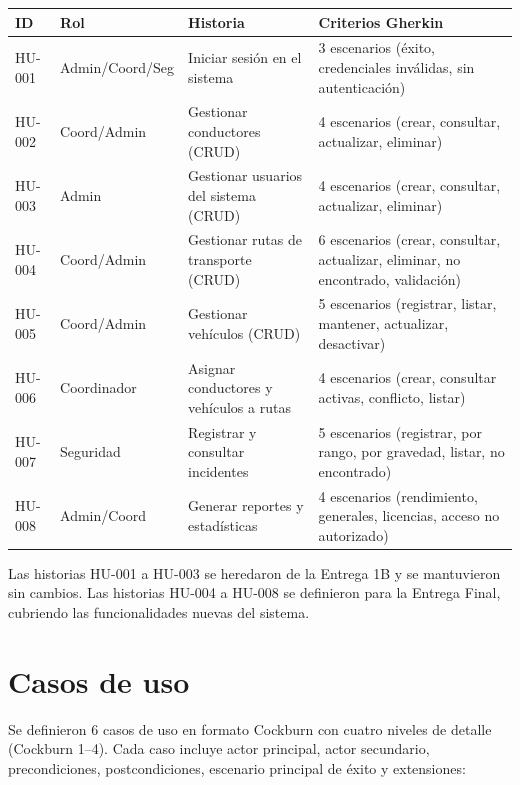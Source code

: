 \begin{longtable}{@{}p{2cm}p{3cm}p{4cm}p{4cm}@{}}
\toprule
\textbf{ID} & \textbf{Rol} & \textbf{Historia} & \textbf{Criterios Gherkin} \\
\midrule
\endhead
HU-001 & Admin/Coord/Seg & Iniciar sesión en el sistema & 3 escenarios (éxito, credenciales inválidas, sin autenticación) \\
HU-002 & Coord/Admin & Gestionar conductores (CRUD) & 4 escenarios (crear, consultar, actualizar, eliminar) \\
HU-003 & Admin & Gestionar usuarios del sistema (CRUD) & 4 escenarios (crear, consultar, actualizar, eliminar) \\
HU-004 & Coord/Admin & Gestionar rutas de transporte (CRUD) & 6 escenarios (crear, consultar, actualizar, eliminar, no encontrado, validación) \\
HU-005 & Coord/Admin & Gestionar vehículos (CRUD) & 5 escenarios (registrar, listar, mantener, actualizar, desactivar) \\
HU-006 & Coordinador & Asignar conductores y vehículos a rutas & 4 escenarios (crear, consultar activas, conflicto, listar) \\
HU-007 & Seguridad & Registrar y consultar incidentes & 5 escenarios (registrar, por rango, por gravedad, listar, no encontrado) \\
HU-008 & Admin/Coord & Generar reportes y estadísticas & 4 escenarios (rendimiento, generales, licencias, acceso no autorizado) \\
\bottomrule
\end{longtable}

Las historias HU-001 a HU-003 se heredaron de la Entrega 1B y se mantuvieron sin cambios. Las historias HU-004 a HU-008 se definieron para la Entrega Final, cubriendo las funcionalidades nuevas del sistema.

\section{Casos de uso}
\label{sec:cu}

Se definieron 6 casos de uso en formato Cockburn \cite{cockburn2001} con cuatro niveles de detalle (Cockburn 1--4). Cada caso incluye actor principal, actor secundario, precondiciones, postcondiciones, escenario principal de éxito y extensiones:

